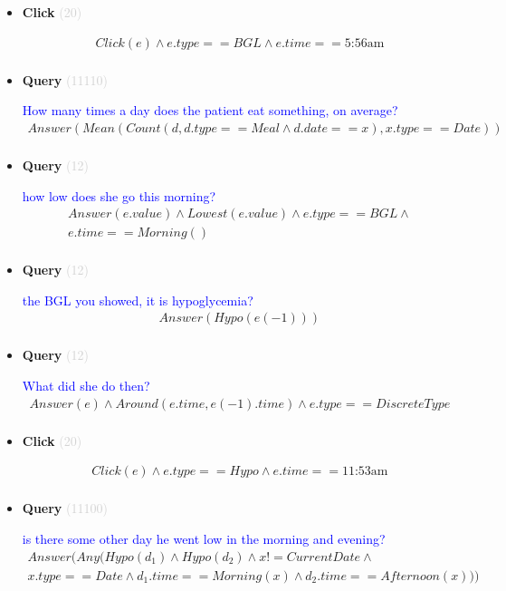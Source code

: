 \documentclass[11pt]{article}
\newcommand{\key}[1]{\textcolor{lightgray}{#1}}
\newcounter{CQuery}
\newcounter{CClick}
\begin{document}
\begin{itemize}
\item
\textbf{Click\theCClick} \key{(20)} \addtocounter{CClick}{1}
\textcolor{blue}{  }
\begin{multline*}
Click(e) \wedge e.type==BGL \wedge e.time==\mbox{5:56am} \\ 
\end{multline*}


\item
\textbf{Query\theCQuery} \key{(11110)} \addtocounter{CQuery}{1}
\textcolor{blue}{ How many times a day does the patient eat something, on average? }
\begin{multline*}
Answer(Mean(Count(d, d.type==Meal \wedge d.date==x), x.type==Date)) \\ 
\end{multline*}


\item
\textbf{Query\theCQuery} \key{(12)} \addtocounter{CQuery}{1}
\textcolor{blue}{ how low does she go this morning? }
\begin{multline*}
Answer(e.value) \wedge Lowest(e.value) \wedge e.type==BGL \wedge \\ 
e.time==Morning() \\ 
\end{multline*}


\item
\textbf{Query\theCQuery} \key{(12)} \addtocounter{CQuery}{1}
\textcolor{blue}{ the BGL you showed, it is hypoglycemia? }
\begin{multline*}
Answer(Hypo(e(-1))) \\ 
\end{multline*}


\item
\textbf{Query\theCQuery} \key{(12)} \addtocounter{CQuery}{1}
\textcolor{blue}{ What did she do then? }
\begin{multline*}
Answer(e) \wedge Around(e.time, e(-1).time) \wedge e.type==DiscreteType \\ 
\end{multline*}


\item
\textbf{Click\theCClick} \key{(20)} \addtocounter{CClick}{1}
\textcolor{blue}{  }
\begin{multline*}
Click(e) \wedge e.type==Hypo \wedge e.time==\mbox{11:53am} \\ 
\end{multline*}


\item
\textbf{Query\theCQuery} \key{(11100)} \addtocounter{CQuery}{1}
\textcolor{blue}{ is there some other day he went low in the morning and evening? }
\begin{multline*}
Answer(Any(Hypo(d_1) \wedge Hypo(d_2) \wedge x != CurrentDate \wedge \\ 
x.type==Date \wedge d_1.time==Morning(x) \wedge d_2.time==Afternoon(x))) \\ 
\end{multline*}



\end{itemize}
\end{document}
